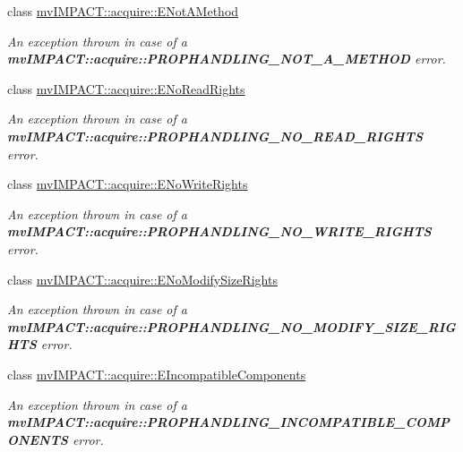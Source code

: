 \begin{DoxyCompactItemize}
class \hyperlink{classmv_i_m_p_a_c_t_1_1acquire_1_1_e_not_a_method}{mv\+I\+M\+P\+A\+C\+T\+::acquire\+::\+E\+Not\+A\+Method}
\begin{DoxyCompactList}\small\item\em An exception thrown in case of a {\bfseries mv\+I\+M\+P\+A\+C\+T\+::acquire\+::\+P\+R\+O\+P\+H\+A\+N\+D\+L\+I\+N\+G\+\_\+\+N\+O\+T\+\_\+\+A\+\_\+\+M\+E\+T\+H\+O\+D} error. \end{DoxyCompactList}\item 
class \hyperlink{classmv_i_m_p_a_c_t_1_1acquire_1_1_e_no_read_rights}{mv\+I\+M\+P\+A\+C\+T\+::acquire\+::\+E\+No\+Read\+Rights}
\begin{DoxyCompactList}\small\item\em An exception thrown in case of a {\bfseries mv\+I\+M\+P\+A\+C\+T\+::acquire\+::\+P\+R\+O\+P\+H\+A\+N\+D\+L\+I\+N\+G\+\_\+\+N\+O\+\_\+\+R\+E\+A\+D\+\_\+\+R\+I\+G\+H\+T\+S} error. \end{DoxyCompactList}\item 
class \hyperlink{classmv_i_m_p_a_c_t_1_1acquire_1_1_e_no_write_rights}{mv\+I\+M\+P\+A\+C\+T\+::acquire\+::\+E\+No\+Write\+Rights}
\begin{DoxyCompactList}\small\item\em An exception thrown in case of a {\bfseries mv\+I\+M\+P\+A\+C\+T\+::acquire\+::\+P\+R\+O\+P\+H\+A\+N\+D\+L\+I\+N\+G\+\_\+\+N\+O\+\_\+\+W\+R\+I\+T\+E\+\_\+\+R\+I\+G\+H\+T\+S} error. \end{DoxyCompactList}\item 
class \hyperlink{classmv_i_m_p_a_c_t_1_1acquire_1_1_e_no_modify_size_rights}{mv\+I\+M\+P\+A\+C\+T\+::acquire\+::\+E\+No\+Modify\+Size\+Rights}
\begin{DoxyCompactList}\small\item\em An exception thrown in case of a {\bfseries mv\+I\+M\+P\+A\+C\+T\+::acquire\+::\+P\+R\+O\+P\+H\+A\+N\+D\+L\+I\+N\+G\+\_\+\+N\+O\+\_\+\+M\+O\+D\+I\+F\+Y\+\_\+\+S\+I\+Z\+E\+\_\+\+R\+I\+G\+H\+T\+S} error. \end{DoxyCompactList}\item 
class \hyperlink{classmv_i_m_p_a_c_t_1_1acquire_1_1_e_incompatible_components}{mv\+I\+M\+P\+A\+C\+T\+::acquire\+::\+E\+Incompatible\+Components}
\begin{DoxyCompactList}\small\item\em An exception thrown in case of a {\bfseries mv\+I\+M\+P\+A\+C\+T\+::acquire\+::\+P\+R\+O\+P\+H\+A\+N\+D\+L\+I\+N\+G\+\_\+\+I\+N\+C\+O\+M\+P\+A\+T\+I\+B\+L\+E\+\_\+\+C\+O\+M\+P\+O\+N\+E\+N\+T\+S} error. \end{DoxyCompactList}\item 

\end{DoxyCompactItemize}
